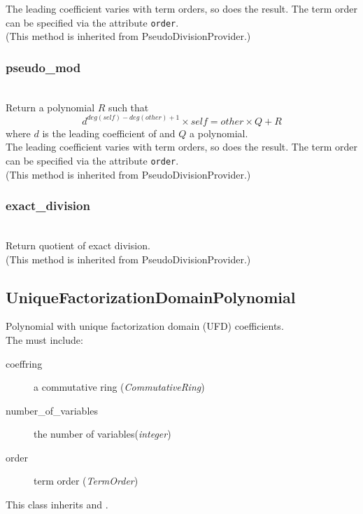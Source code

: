   The leading coefficient varies with term orders, so does the result.
  The term order can be specified via the attribute {\tt order}.\\
  (This method is inherited from PseudoDivisionProvider.)

  \subsubsection{pseudo\_mod}
  \\
  \quad Return a polynomial \(R\) such that
  \[ d^{deg(self) - deg(other) + 1} \times self = other \times Q + R\]
  where \(d\) is the leading coefficient of  and \(Q\)
  a polynomial.\\
  \quad The leading coefficient varies with term orders,
  so does the result. The term order can be specified via
  the attribute {\tt order}.\\
  (This method is inherited from PseudoDivisionProvider.)

  \subsubsection{exact\_division}
  \\
  \spacing
  \quad Return quotient of exact division.\\
  (This method is inherited from PseudoDivisionProvider.)

 \subsection{UniqueFactorizationDomainPolynomial}
 Polynomial with unique factorization domain (UFD) coefficients.
 \initialize
   \\
  \spacing
  \quad The  must include:
  \begin{description}
  \item[coeffring] a commutative ring ({\it CommutativeRing})
  \item[number\_of\_variables] the number of variables({\it integer})
  \item[order] term order ({\it TermOrder})
  \end{description}
  \quad This class inherits  and
  .
  \method
